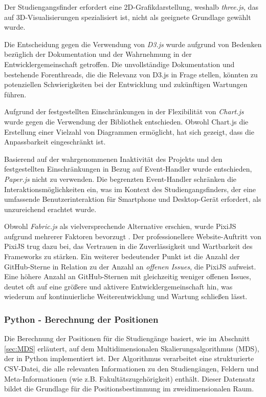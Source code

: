 Der Studiengangsfinder erfordert eine 2D-Grafikdarstellung, weshalb
\textit{three.js}, das auf 3D-Visualisierungen spezialisiert ist, nicht als
geeignete Grundlage gewählt wurde. \parencite{threejs_threejs_2023}

Die Entscheidung gegen die Verwendung von \textit{D3.js} wurde aufgrund
von Bedenken bezüglich der Dokumentation und der Wahrnehmung in der 
Entwicklergemeinschaft getroffen. Die unvollständige Dokumentation und
bestehende Forenthreads, die die Relevanz von D3.js in Frage stellen, könnten zu
potenziellen Schwierigkeiten bei der Entwicklung und zukünftigen Wartungen
führen. \parencite{bostock_d3js_2023}


Aufgrund der festgestellten Einschränkungen in der Flexibilität von
\textit{Chart.js} wurde gegen die Verwendung der Bibliothek entschieden. Obwohl
Chart.js die Erstellung einer Vielzahl von Diagrammen ermöglicht, hat sich
gezeigt, dass die Anpassbarkeit eingeschränkt ist. \parencite{etimberg_chartjs_2023}

Basierend auf der wahrgenommenen Inaktivität des Projekts und den festgestellten 
Einschränkungen in Bezug auf Event-Handler wurde entschieden, \textit{Paper.js}
nicht zu verwenden. \parencite{lehni_paperjs_2023} Die begrenzten Event-Handler schränken
die Interaktionsmöglichkeiten ein, was im Kontext des Studiengangsfinders, der
eine umfassende Benutzerinteraktion für Smartphone und Desktop-Gerät erfordert,
als unzureichend erachtet wurde. \parencite{etimberg_paperjs_2023}

Obwohl \textit{Fabric.js} als vielversprechende Alternative erschien, wurde
PixiJS aufgrund mehrerer Faktoren bevorzugt \parencite{zaytsev_fabricjs_2023}. Der
professionellere Website-Auftritt von PixiJS trug dazu bei, das Vertrauen in
die Zuverlässigkeit und Wartbarkeit des Frameworks zu stärken. Ein weiterer
bedeutender Punkt ist die Anzahl der GitHub-Sterne in Relation zu der Anzahl an
\textit{offenen Issues}, die PixiJS aufweist. Eine höhere Anzahl an
GitHub-Sternen mit gleichzeitig weniger offenen Issues, deutet oft auf eine
größere und aktivere Entwicklergemeinschaft hin, was wiederum auf
kontinuierliche Weiterentwicklung und Wartung schließen lässt.
\parencite{batista_github_2023}

\newpage
\subsubsection{Python - Berechnung der Positionen}
Die Berechnung der Positionen für die Studiengänge basiert, wie im Abschnitt
\ref{sec:MDS} erläutert, auf dem Multidimensionalen Skalierungsalgorithmus
(MDS), der in Python implementiert ist. Der Algorithmus verarbeitet eine
strukturierte CSV-Datei, die alle relevanten Informationen zu den Studiengängen,
Feldern und Meta-Informationen (wie z.B. Fakultätszugehörigkeit) enthält. Dieser
Datensatz bildet die Grundlage für die Positionsbestimmung im zweidimensionalen
Raum.

